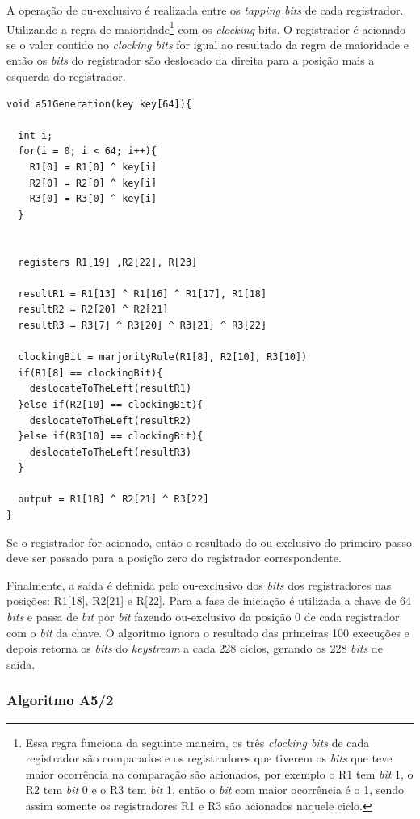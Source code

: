 A operação de ou-exclusivo é realizada entre os \textit{tapping bits} de cada registrador. Utilizando a regra de maioridade\footnote{Essa regra funciona da seguinte maneira, os três \textit{clocking bits} de cada registrador são comparados e os registradores que tiverem os \textit{bits} que teve maior ocorrência na comparação são acionados, por exemplo o R1 tem \textit{bit} 1, o R2 tem \textit{bit} 0 e o R3 tem \textit{bit} 1, então o \textit{bit} com maior ocorrência é o 1, sendo assim somente os registradores R1 e R3 são acionados naquele ciclo.} com os \textit{clocking} bits. O registrador é acionado se o valor contido no \textit{clocking bits} for igual ao resultado da regra de maioridade e então os \textit{bits} do registrador são deslocado da direita para a posição mais a esquerda do registrador.

\begin{lstlisting}[caption={Pseudo-código A5/1}, label=a51-pseudo-code]
void a51Generation(key key[64]){

  int i;
  for(i = 0; i < 64; i++){
  	R1[0] = R1[0] ^ key[i]
	R2[0] = R2[0] ^ key[i]
	R3[0] = R3[0] ^ key[i]  
  }
  	

  registers R1[19] ,R2[22], R[23]
  
  resultR1 = R1[13] ^ R1[16] ^ R1[17], R1[18]
  resultR2 = R2[20] ^ R2[21]
  resultR3 = R3[7] ^ R3[20] ^ R3[21] ^ R3[22]
  
  clockingBit = marjorityRule(R1[8], R2[10], R3[10])
  if(R1[8] == clockingBit){
  	deslocateToTheLeft(resultR1)
  }else if(R2[10] == clockingBit){
    deslocateToTheLeft(resultR2)
  }else if(R3[10] == clockingBit){
    deslocateToTheLeft(resultR3)
  }
  
  output = R1[18] ^ R2[21] ^ R3[22]
}
    \end{lstlisting}

Se o registrador for acionado, então o resultado do ou-exclusivo do primeiro passo deve ser passado para a posição zero do registrador correspondente.

Finalmente, a saída é definida pelo ou-exclusivo dos \textit{bits} dos registradores nas posições: R1[18], R2[21] e R[22]. Para a fase de iniciação é utilizada a chave de 64 \textit{bits} e passa de \textit{bit} por \textit{bit} fazendo ou-exclusivo da posição 0 de cada registrador com o \textit{bit} da chave. O algoritmo ignora o resultado das primeiras 100 execuções e depois retorna os \textit{bits} do \textit{keystream} a cada 228 ciclos, gerando os 228 \textit{bits} de saída.

\subsubsection{Algoritmo A5/2}
\label{algorithm-a52}

